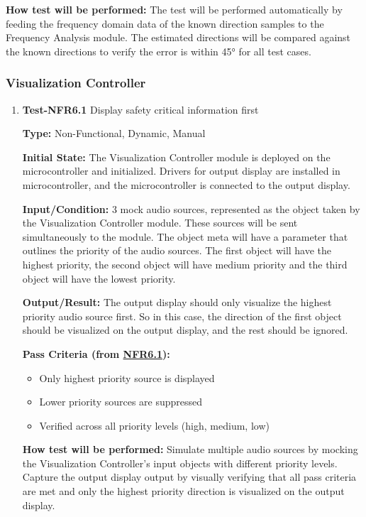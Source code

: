 \documentclass[12pt, titlepage]{article}
\begin{document}
\begin{enumerate}
\textbf{How test will be performed:}
The test will be performed automatically by feeding the frequency domain data of
the known direction samples to the Frequency Analysis module. The estimated
directions will be compared against the known directions to verify the error is
within 45° for all test cases.


\end{enumerate}

\subsubsection{Visualization Controller}
		

\begin{enumerate}

\item{\textbf{Test-NFR6.1} Display safety critical information first\\}

\textbf{Type:} Non-Functional, Dynamic, Manual
					
\textbf{Initial State:} 
The Visualization Controller module is deployed on the microcontroller and
initialized. Drivers for output display are installed in microcontroller, and
the microcontroller is connected to the output display. 
					
\textbf{Input/Condition:} 
3 mock audio sources, represented as the object taken by the Visualization
Controller module. These sources will be sent simultaneously to the module. The
object meta will have a parameter that outlines the priority of the audio
sources. The first object will have the highest priority, the second object will
have medium priority and the third object will have the lowest priority.

\textbf{Output/Result:} 
The output display should only visualize the highest priority audio source
first. So in this case, the direction of the first object should be visualized
on the output display, and the rest should be ignored.

\textbf{Pass Criteria (from \hyperref[SRS-NFR6_1]{NFR6.1}):}
\begin{itemize}
\item Only highest priority source is displayed
\item Lower priority sources are suppressed
\item Verified across all priority levels (high, medium, low)
\end{itemize}
					
\textbf{How test will be performed:} 
Simulate multiple audio sources by mocking the Visualization Controller's input
objects with different priority levels. Capture the output display output by
visually verifying that all pass criteria are met and only the highest priority
direction is visualized on the output display.


\end{enumerate}
\end{document}
